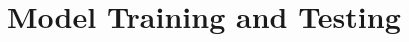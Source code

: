 \documentclass[11pt,a4paper]{article}
\begin{document}
\section{Model Training and Testing}


%
%
%

%
%
%
%

%
%
%


%
%
%

\end{document}
